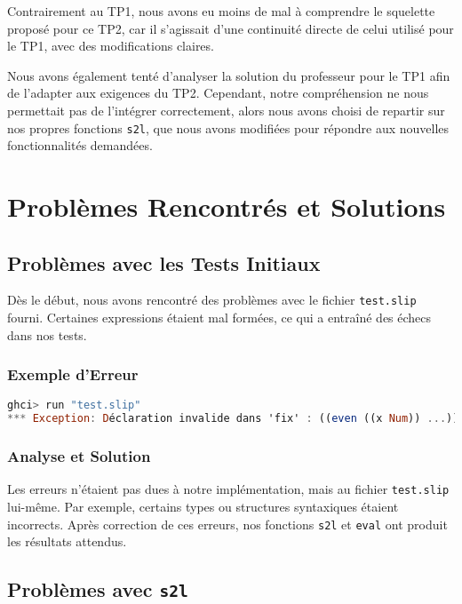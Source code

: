 \documentclass[a4paper,12pt]{article}
\begin{document}
Contrairement au TP1, nous avons eu moins de mal à comprendre le squelette proposé pour ce TP2, car il s'agissait d'une continuité directe de celui utilisé pour le TP1, avec des modifications claires.

Nous avons également tenté d'analyser la solution du professeur pour le TP1 afin de l'adapter aux exigences du TP2. Cependant, notre compréhension ne nous permettait pas de l'intégrer correctement, alors nous avons choisi de repartir sur nos propres fonctions \texttt{s2l}, que nous avons modifiées pour répondre aux nouvelles fonctionnalités demandées.

\section{Problèmes Rencontrés et Solutions}

\subsection{Problèmes avec les Tests Initiaux}

Dès le début, nous avons rencontré des problèmes avec le fichier \texttt{test.slip} fourni. Certaines expressions étaient mal formées, ce qui a entraîné des échecs dans nos tests.

\subsubsection{Exemple d'Erreur}

\begin{lstlisting}[language=Haskell, caption={Erreur rencontrée lors de l'exécution de \texttt{run "test.slip"}}, label={lst:testError}]
ghci> run "test.slip"
*** Exception: Déclaration invalide dans 'fix' : ((even ((x Num)) ...))
\end{lstlisting}

\subsubsection{Analyse et Solution}

Les erreurs n'étaient pas dues à notre implémentation, mais au fichier \texttt{test.slip} lui-même. Par exemple, certains types ou structures syntaxiques étaient incorrects. Après correction de ces erreurs, nos fonctions \texttt{s2l} et \texttt{eval} ont produit les résultats attendus.

\subsection{Problèmes avec \texttt{s2l}}
\end{document}
